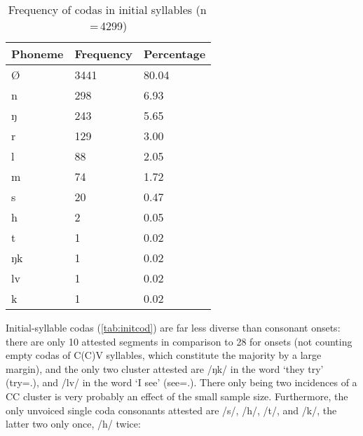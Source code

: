 \begin{table}[pth]\centering
\caption[Frequency of codas in initial syllables]{Frequency of codas in initial syllables (n\,=\,4299)}
\begin{tabu} to 0.5\textwidth{X X[c] X[c]}
\tableheaderfont\toprule
Phoneme
	& Frequency
	& Percentage
	\\
	
\toprule

Ø
	& 3441
	& 80.04\pct
	\\

\midrule

n
	& 298
	& 6.93\pct
	\\

ŋ
	& 243
	& 5.65\pct
	\\

r
	& 129
	& 3.00\pct
	\\

l
	& 88
	& 2.05\pct
	\\

m
	& 74
	& 1.72\pct
	\\

s
	& 20
	& 0.47\pct
	\\

h
	& 2
	& 0.05\pct
	\\

t
	& 1
	& 0.02\pct
	\\

ŋk
	& 1
	& 0.02\pct
	\\

lv
	& 1
	& 0.02\pct
	\\

k
	& 1
	& 0.02\pct
	\\

\bottomrule
\end{tabu}
\label{tab:initcod}
\end{table}

Initial-syllable codas (\autoref{tab:initcod}) are far less diverse than 
consonant onsets: there are only 10 attested segments in comparison to 28 for 
onsets (not counting empty codas of C(C)V syllables, which constitute the 
majority by a large margin), and the only two cluster attested are /ŋk/ in the 
word  `they try' (try=\TplM{}.\Aarg{}), and /lv/ in the 
word  `I see' (see=\Fpl{}.\Aarg{}). There only being 
two incidences of a CC cluster is very probably an effect of the small 
sample size. Furthermore, the only unvoiced single coda consonants attested are 
/s/, /h/, /t/, and /k/, the latter two only once, /h/ twice:

